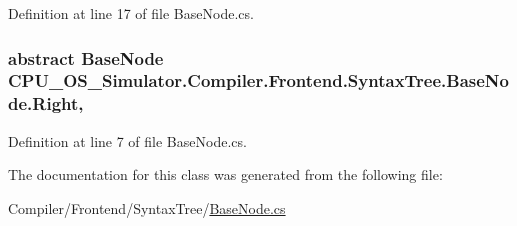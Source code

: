 Definition at line 17 of file Base\+Node.\+cs.

\hypertarget{class_c_p_u___o_s___simulator_1_1_compiler_1_1_frontend_1_1_syntax_tree_1_1_base_node_a488735e2d5ee9a31a1ee3bdb6742c06d}{}
\subsubsection[{Right}]{\setlength{\rightskip}{0pt plus 5cm}abstract {\bf Base\+Node} C\+P\+U\+\_\+\+O\+S\+\_\+\+Simulator.\+Compiler.\+Frontend.\+Syntax\+Tree.\+Base\+Node.\+Right\hspace{0.3cm}{\ttfamily [get]}, {\ttfamily [set]}}\label{class_c_p_u___o_s___simulator_1_1_compiler_1_1_frontend_1_1_syntax_tree_1_1_base_node_a488735e2d5ee9a31a1ee3bdb6742c06d}


Definition at line 7 of file Base\+Node.\+cs.



The documentation for this class was generated from the following file\+:\begin{DoxyCompactItemize}
\item 
Compiler/\+Frontend/\+Syntax\+Tree/\hyperlink{_base_node_8cs}{Base\+Node.\+cs}\end{DoxyCompactItemize}
